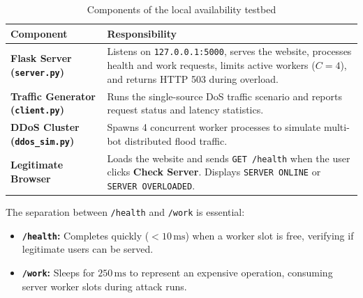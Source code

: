 \documentclass[11pt,a4paper]{article}
\begin{document}
\begin{table}[H]
\centering
\small
\caption{Components of the local availability testbed}
\label{tab:components}
\begin{tabularx}{\textwidth}{p{3.8cm}X}
\toprule
\textbf{Component} & \textbf{Responsibility} \\
\midrule
\textbf{Flask Server (\texttt{server.py})} & Listens on \texttt{127.0.0.1:5000}, serves the website, processes health and work requests, limits active workers ($C=4$), and returns HTTP 503 during overload. \\
\textbf{Traffic Generator (\texttt{client.py})} & Runs the single-source DoS traffic scenario and reports request status and latency statistics. \\
\textbf{DDoS Cluster (\texttt{ddos\_sim.py})} & Spawns 4 concurrent worker processes to simulate multi-bot distributed flood traffic. \\
\textbf{Legitimate Browser} & Loads the website and sends \texttt{GET /health} when the user clicks \textbf{Check Server}. Displays \texttt{SERVER ONLINE} or \texttt{SERVER OVERLOADED}. \\
\bottomrule
\end{tabularx}
\end{table}

\noindent The separation between \texttt{/health} and \texttt{/work} is essential:
\begin{itemize}[leftmargin=*]
    \item \textbf{\texttt{/health}:} Completes quickly ($<10\,\text{ms}$) when a worker slot is free, verifying if legitimate users can be served.
    \item \textbf{\texttt{/work}:} Sleeps for $250\,\text{ms}$ to represent an expensive operation, consuming server worker slots during attack runs.
\end{itemize}
\end{document}
